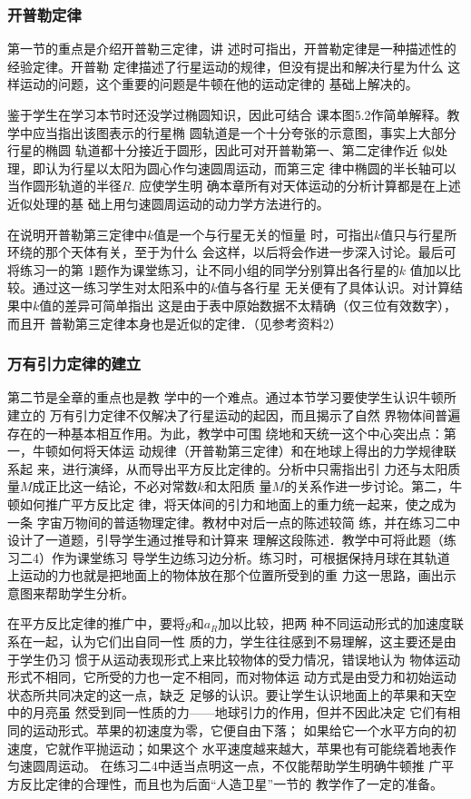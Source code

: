 \subsubsection{开普勒定律}

第一节的重点是介绍开普勒三定律，讲
述时可指出，开普勒定律是一种描述性的经验定律。开普勒
定律描述了行星运动的规律，但没有提出和解决行星为什么
这样运动的问题，这个重要的问题是牛顿在他的运动定律的
基础上解决的。

鉴于学生在学习本节时还没学过椭圆知识，因此可结合
课本图5.2作简单解释。教学中应当指出该图表示的行星椭
圆轨道是一个十分夸张的示意图，事实上大部分行星的椭圆
轨道都十分接近于圆形，因此可对开普勒第一、第二定律作近
似处理，即认为行星以太阳为圆心作匀速圆周运动，而第三定
律中椭圆的半长轴可以当作圆形轨道的半径$R$. 应使学生明
确本章所有对天体运动的分析计算都是在上述近似处理的基
础上用匀速圆周运动的动力学方法进行的。

在说明开普勒第三定律中$k$值是一个与行星无关的恒量
时，可指出$k$值只与行星所环绕的那个天体有关，至于为什么
会这样，以后将会作进一步深入讨论。最后可将练习一的第
1题作为课堂练习，让不同小组的同学分别算出各行星的$k$
值加以比较。通过这一练习学生对太阳系中的$k$值与各行星
无关便有了具体认识。对计算结果中$k$值的差异可简单指出
这是由于表中原始数据不太精确（仅三位有效数字），而且开
普勒第三定律本身也是近似的定律．（见参考资料2）

\subsubsection{万有引力定律的建立}

第二节是全章的重点也是教
学中的一个难点。通过本节学习要使学生认识牛顿所建立的
万有引力定律不仅解决了行星运动的起因，而且揭示了自然
界物体间普遍存在的一种基本相互作用。为此，教学中可围
绕地和天统一这个中心突出点：第一，牛顿如何将天体运
动规律（开普勒第三定律）和在地球上得出的力学规律联系起
来，进行演绎，从而导出平方反比定律的。分析中只需指出引
力还与太阳质量$M$成正比这一结论，不必对常数$k$和太阳质
量$M$的关系作进一步讨论。第二，牛顿如何推广平方反比定
律，将天体间的引力和地面上的重力统一起来，使之成为一条
字宙万物间的普适物理定律。教材中对后一点的陈述较简
练，并在练习二中设计了一道题，引导学生通过推导和计算来
理解这段陈述．教学中可将此题（练习二4）作为课堂练习
导学生边练习边分析。练习时，可根据保持月球在其轨道
上运动的力也就是把地面上的物体放在那个位置所受到的重
力这一思路，画出示意图来帮助学生分析。

在平方反比定律的推广中，要将$g$和$a_R$加以比较，把两
种不同运动形式的加速度联系在一起，认为它们出自同一性
质的力，学生往往感到不易理解，这主要还是由于学生仍习
惯于从运动表现形式上来比较物体的受力情况，错误地认为
物体运动形式不相同，它所受的力也一定不相同，而对物体运
动方式是由受力和初始运动状态所共同决定的这一点，缺乏
足够的认识。要让学生认识地面上的苹果和天空中的月亮虽
然受到同一性质的力——地球引力的作用，但并不因此决定
它们有相同的运动形式。苹果的初速度为零，它便自由下落；
如果给它一个水平方向的初速度，它就作平抛运动；如果这个
水平速度越来越大，苹果也有可能绕着地表作匀速圆周运动。
在练习二4中适当点明这一点，不仅能帮助学生明确牛顿推
广平方反比定律的合理性，而且也为后面“人造卫星”一节的
教学作了一定的准备。


